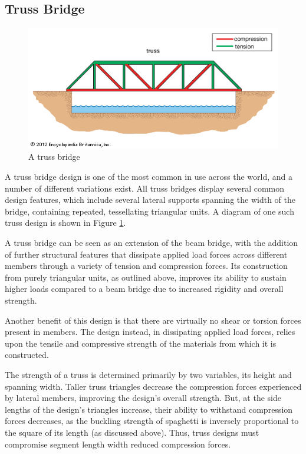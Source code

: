 \documentclass[a4paper,11pt]{article}
\begin{document}
\subsection{Truss Bridge}

\begin{figure}
\begin{center}
\includegraphics[width=\textwidth]{figures/truss.png}
\end{center}
\caption{A truss bridge}
\label{research:truss}
\end{figure}

A truss bridge design is one of the most common in use across the world, and a
number of different variations exist.
All truss bridges display several common design features, which include
several lateral supports spanning the width of the bridge, containing repeated,
tessellating triangular units.
A diagram of one such truss design is shown in Figure \ref{research:truss}.

A truss bridge can be seen as an extension of the beam bridge, with the addition
of further structural features that dissipate applied load forces across
different members through a variety of tension and compression forces.
Its construction from purely triangular units, as outlined above, improves its
ability to sustain higher loads compared to a beam bridge due to increased
rigidity and overall strength.

Another benefit of this design is that there are virtually no shear or torsion
forces present in members.
The design instead, in dissipating applied load forces, relies upon the tensile
and compressive strength of the materials from which it is constructed.

The strength of a truss is determined primarily by two variables, its height and
spanning width.
Taller truss triangles decrease the compression forces experienced by lateral
members, improving the design's overall strength.
But, at the side lengths of the design's triangles increase, their ability to
withstand compression forces decreases, as the buckling strength of spaghetti is
inversely proportional to the square of its length (as discussed above).
Thus, truss designs must compromise segment length width reduced compression
forces.
\end{document}
